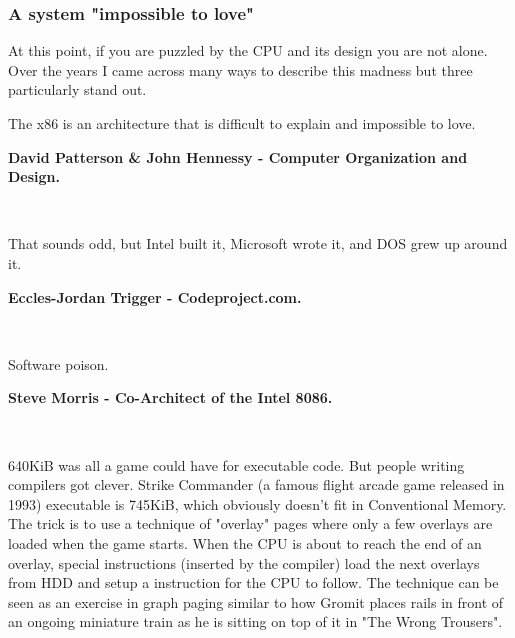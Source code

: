 \documentclass[book.tex]{subfiles}
\begin{document}
\subsubsection{A system "impossible to love"}
At this point, if you are puzzled by the CPU and its design you are not alone. Over the years I came across many ways to describe this madness but three particularly stand out.\\

\par
 \begin{fancyquotes}
   The x86 is an architecture that is difficult to explain and impossible to love.\\
   \par
\textbf{David Patterson \& John Hennessy - Computer Organization and Design.}
 \end{fancyquotes}\\

\par

\par
 \begin{fancyquotes}
    That sounds odd, but Intel built it, Microsoft wrote it, and DOS grew up around it.\\
   \par
\textbf{Eccles-Jordan Trigger - Codeproject.com.}
 \end{fancyquotes}\\
\par
 \begin{fancyquotes}
    Software poison.\\
   \par
\textbf{Steve Morris - Co-Architect of the Intel 8086.}
 \end{fancyquotes}\\


\par
{} 640KiB was all a game could have for executable code. But people writing compilers got clever. Strike Commander (a famous flight arcade game released in 1993) executable is 745KiB, which obviously doesn't fit in Conventional Memory. The trick is to use a technique of "overlay" pages where only a few overlays are loaded when the game starts. When the CPU is about to reach the end of an overlay, special instructions (inserted by the compiler) load the next overlays from HDD and setup a  instruction for the CPU to follow. The technique can be seen as an exercise in graph paging similar to how Gromit places rails in front of an ongoing miniature train as he is sitting on top of it in "The Wrong Trousers".\\
\par
\end{document}
